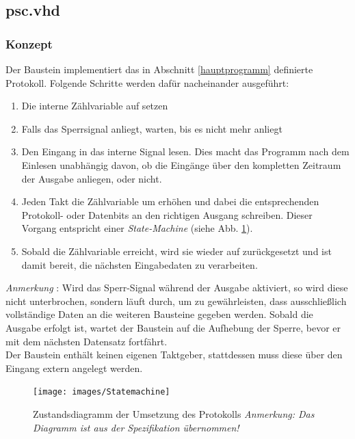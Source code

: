 \documentclass[a4paper]{article}
\begin{document}
        \subsection{psc.vhd}
        \subsubsection{Konzept}
        	Der Baustein implementiert das in Abschnitt \ref{hauptprogramm} definierte Protokoll. Folgende Schritte werden dafür nacheinander ausgeführt:\\
        	\begin{enumerate}
        		\item Die interne Zählvariable  auf  setzen
        		\item Falls das Sperrsignal  anliegt, warten, bis es nicht mehr anliegt
        		\item Den Eingang  in das interne Signal  lesen. Dies macht das Programm nach dem Einlesen unabhängig davon, ob die Eingänge über den kompletten Zeitraum der Ausgabe anliegen, oder nicht.
        		\item Jeden Takt die Zählvariable um  erhöhen und dabei die entsprechenden Protokoll- oder Datenbits an den richtigen Ausgang schreiben. Dieser Vorgang entspricht einer \emph{State-Machine} (siehe Abb. \ref{fig:statemachine}).
        		\item Sobald die Zählvariable  erreicht, wird sie wieder auf  zurückgesetzt und ist damit bereit, die nächsten Eingabedaten zu verarbeiten.
        	\end{enumerate}
			\emph{Anmerkung} \label{sperrsignal-anmerkung}: Wird das Sperr-Signal  während der Ausgabe aktiviert, so wird diese nicht unterbrochen, sondern läuft durch, 
			um zu gewährleisten, dass ausschließlich vollständige Daten an die weiteren Bausteine gegeben werden. 
			Sobald die Ausgabe erfolgt ist, wartet der Baustein auf die Aufhebung der Sperre, bevor er mit dem nächsten Datensatz fortfährt.\\
        	
        	\noindent Der Baustein enthält keinen eigenen Taktgeber, stattdessen muss diese über den Eingang  extern angelegt werden.
        
           	\begin{figure}[hb]
        		\centering
        		\texttt{[image: images/Statemachine]}
        		\caption{Zustandsdiagramm der Umsetzung des Protokolls \newline \emph{Anmerkung: Das Diagramm ist aus der Spezifikation übernommen!}}
        		\label{fig:statemachine}
        	\end{figure}
        
\end{document}

